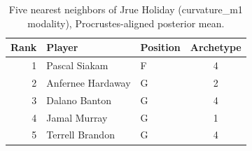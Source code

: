 \begin{table}[htbp]
  \centering\small
  \begin{tabular}{rllc}
    \toprule
    Rank & Player & Position & Archetype \\
    \midrule
    1 & Pascal Siakam & F & 4 \\
    2 & Anfernee Hardaway & G & 2 \\
    3 & Dalano Banton & G & 4 \\
    4 & Jamal Murray & G & 1 \\
    5 & Terrell Brandon & G & 4 \\
    \bottomrule
  \end{tabular}
  \caption{Five nearest neighbors of Jrue Holiday (curvature_m1 modality), Procrustes-aligned posterior mean.}
  \label{tab:Jrue_Holiday_neighbors_curvature_m1}
\end{table}

